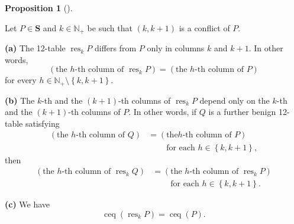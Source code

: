 \documentclass[numbers=enddot,12pt,final,onecolumn,notitlepage]{scrartcl}%
\theoremstyle{definition}
\newtheorem{prop}[theo]{Proposition}
\newenvironment{proposition}[1][]
{\begin{prop}[#1]\begin{leftbar}}
{\end{leftbar}\end{prop}}
\begin{document}
\begin{proposition}
\label{prop.conflict-resolution-props}Let $P\in\mathbf{S}$ and $k\in
\mathbb{N}_{+}$ be such that $\left(  k,k+1\right)  $ is a conflict of $P$.

\textbf{(a)} The 12-table $\operatorname*{res}\nolimits_{k}P$ differs from $P$
only in columns $k$ and $k+1$. In other words,%
\begin{equation}
\left(  \text{the }h\text{-th column of }\operatorname*{res}\nolimits_{k}%
P\right)  =\left(  \text{the }h\text{-th column of }P\right)
\label{pf.lem.BK.res.loc}%
\end{equation}
for every $h\in\mathbb{N}_{+}\setminus\left\{  k,k+1\right\}  $.

\textbf{(b)} The $k$-th and the $\left(  k+1\right)  $-th columns of
$\operatorname*{res}\nolimits_{k}P$ depend only on the $k$-th and the $\left(
k+1\right)  $-th columns of $P$. In other words, if $Q$ is a further benign
12-table satisfying%
\begin{align*}
\left(  \text{the }h\text{-th column of }Q\right)   &  =\left(  \text{the
}h\text{-th column of }P\right) \\
&  \ \ \ \ \ \ \ \ \ \ \text{for each }h\in\left\{  k,k+1\right\}  ,
\end{align*}
then%
\begin{align}
\left(  \text{the }h\text{-th column of }\operatorname*{res}\nolimits_{k}%
Q\right)   &  =\left(  \text{the }h\text{-th column of }\operatorname*{res}%
\nolimits_{k}P\right) \label{pf.lem.BK.res.loc2}\\
&  \ \ \ \ \ \ \ \ \ \ \text{for each }h\in\left\{  k,k+1\right\}  .\nonumber
\end{align}


\textbf{(c)} We have%
\begin{equation}
\operatorname*{ceq}\left(  \operatorname*{res}\nolimits_{k}P\right)
=\operatorname*{ceq}\left(  P\right)  . \label{pf.lem.BK.res.ceq}%
\end{equation}



\end{proposition}
\end{document}
